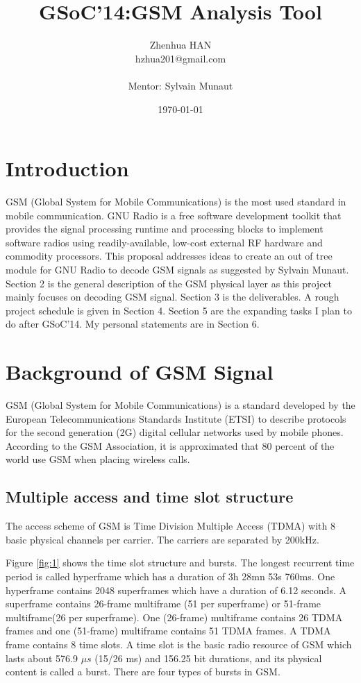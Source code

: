 \documentclass[a4paper,12pt,oneside]{article}
\title{GSoC'14:GSM Analysis Tool}
\date{\today}
\author{Zhenhua HAN\\ hzhua201@gmail.com\\ \\Mentor: Sylvain Munaut}
\begin{document}
\maketitle
\tableofcontents
\newpage
\section{Introduction}
GSM (Global System for Mobile Communications) is the most used standard in mobile communication. GNU Radio is a free software development toolkit that provides the signal processing runtime and processing blocks to implement software radios using readily-available, low-cost external RF hardware and commodity processors.\cite{gnuradio} This proposal addresses ideas to create an out of tree module for GNU Radio to decode GSM signals as suggested by Sylvain Munaut. Section 2 is the general description of the GSM physical layer as this project mainly focuses on decoding GSM signal. Section 3 is the deliverables.
A rough project schedule is given in Section 4. Section 5 are the expanding tasks I plan to do after GSoC'14. My personal statements are in Section 6.
\section{Background of GSM Signal}
GSM (Global System for Mobile Communications) is a standard developed by the European Telecommunications Standards Institute (ETSI) to describe protocols for the second generation (2G) digital cellular networks used by mobile phones. According to the GSM Association, it is approximated that 80 percent of the world use GSM when placing wireless calls.

\subsection{Multiple access and time slot structure}
The access scheme of GSM is Time Division Multiple Access (TDMA) with 8 basic physical channels per carrier. The carriers are separated by 200kHz.

Figure \ref{fig:1} shows the time slot structure and bursts. The longest recurrent time period is called hyperframe which has a duration of 3h 28mn 53s 760ms. One hyperframe contains 2048 superframes which have a duration of 6.12 seconds. A superframe contains 26-frame multiframe (51 per superframe) or 51-frame multiframe(26 per superframe). One (26-frame) multiframe contains 26 TDMA frames and one (51-frame) multiframe contains 51 TDMA frames. A TDMA frame contains 8 time slots. A time slot is the basic radio resource of GSM which lasts about 576.9 $\mu s$ (15/26 ms) and 156.25 bit durations, and its physical content is called a burst. There are four types of bursts in GSM.
\end{document}
